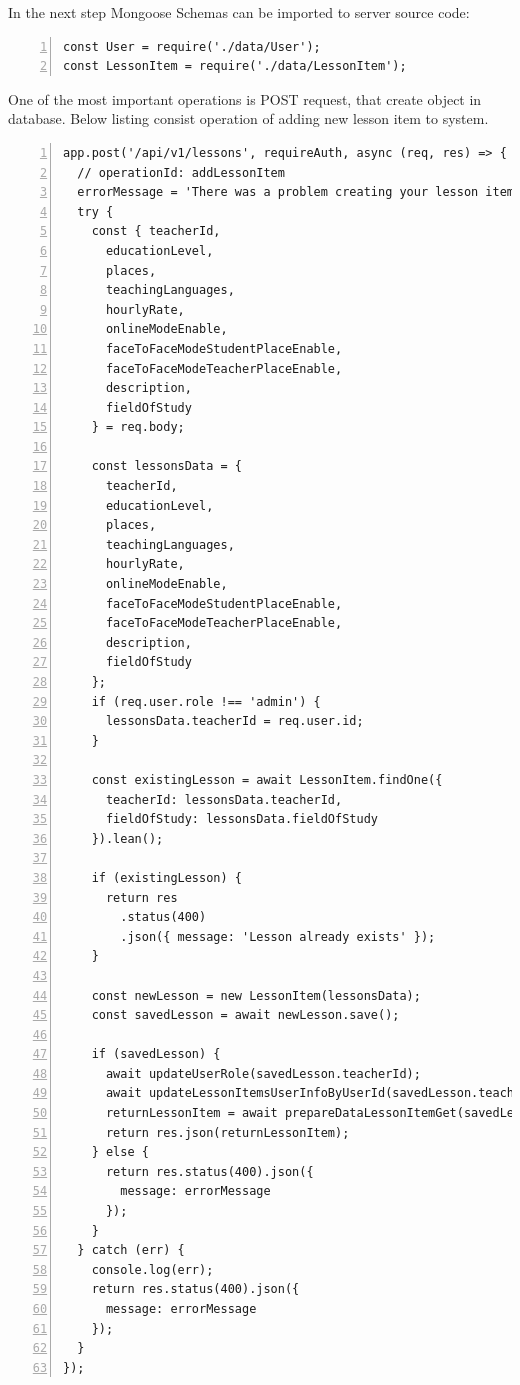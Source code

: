 In the next step Mongoose Schemas can be imported to server source code:

\begin{lstlisting}[breaklines=true, numbers=left, stepnumber=1]
const User = require('./data/User');
const LessonItem = require('./data/LessonItem');
\end{lstlisting}

One of the most important operations is POST request, that create object in database. Below listing consist operation of adding new lesson item to system.
\begin{lstlisting}[breaklines=true, numbers=left, stepnumber=1]
app.post('/api/v1/lessons', requireAuth, async (req, res) => {
  // operationId: addLessonItem
  errorMessage = 'There was a problem creating your lesson item';
  try {
    const { teacherId,
      educationLevel,
      places,
      teachingLanguages,
      hourlyRate,
      onlineModeEnable,
      faceToFaceModeStudentPlaceEnable,
      faceToFaceModeTeacherPlaceEnable,
      description,
      fieldOfStudy
    } = req.body;

    const lessonsData = {
      teacherId,
      educationLevel,
      places,
      teachingLanguages,
      hourlyRate,
      onlineModeEnable,
      faceToFaceModeStudentPlaceEnable,
      faceToFaceModeTeacherPlaceEnable,
      description,
      fieldOfStudy
    };
    if (req.user.role !== 'admin') {
      lessonsData.teacherId = req.user.id;
    }

    const existingLesson = await LessonItem.findOne({
      teacherId: lessonsData.teacherId,
      fieldOfStudy: lessonsData.fieldOfStudy
    }).lean();

    if (existingLesson) {
      return res
        .status(400)
        .json({ message: 'Lesson already exists' });
    }

    const newLesson = new LessonItem(lessonsData);
    const savedLesson = await newLesson.save();

    if (savedLesson) {
      await updateUserRole(savedLesson.teacherId);
      await updateLessonItemsUserInfoByUserId(savedLesson.teacherId);
      returnLessonItem = await prepareDataLessonItemGet(savedLesson.toObject());
      return res.json(returnLessonItem);
    } else {
      return res.status(400).json({
        message: errorMessage
      });
    }
  } catch (err) {
    console.log(err);
    return res.status(400).json({
      message: errorMessage
    });
  }
});
\end{lstlisting}

